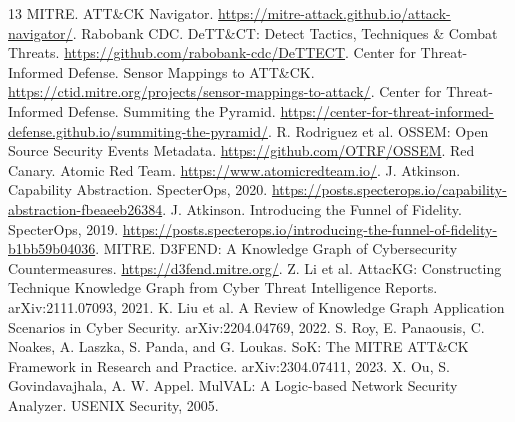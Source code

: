\documentclass[10pt]{article}
\begin{document}
\begin{thebibliography}{13}
 MITRE. ATT\&CK Navigator. \url{https://mitre-attack.github.io/attack-navigator/}.
 Rabobank CDC. DeTT\&CT: Detect Tactics, Techniques \& Combat Threats. \url{https://github.com/rabobank-cdc/DeTTECT}.
 Center for Threat-Informed Defense. Sensor Mappings to ATT\&CK. \url{https://ctid.mitre.org/projects/sensor-mappings-to-attack/}.
 Center for Threat-Informed Defense. Summiting the Pyramid. \url{https://center-for-threat-informed-defense.github.io/summiting-the-pyramid/}.
 R. Rodriguez et al. OSSEM: Open Source Security Events Metadata. \url{https://github.com/OTRF/OSSEM}.
 Red Canary. Atomic Red Team. \url{https://www.atomicredteam.io/}.
 J. Atkinson. Capability Abstraction. SpecterOps, 2020. \url{https://posts.specterops.io/capability-abstraction-fbeaeeb26384}.
 J. Atkinson. Introducing the Funnel of Fidelity. SpecterOps, 2019. \url{https://posts.specterops.io/introducing-the-funnel-of-fidelity-b1bb59b04036}.
 MITRE. D3FEND: A Knowledge Graph of Cybersecurity Countermeasures. \url{https://d3fend.mitre.org/}.
 Z. Li et al. AttacKG: Constructing Technique Knowledge Graph from Cyber Threat Intelligence Reports. arXiv:2111.07093, 2021.
 K. Liu et al. A Review of Knowledge Graph Application Scenarios in Cyber Security. arXiv:2204.04769, 2022.
 S. Roy, E. Panaousis, C. Noakes, A. Laszka, S. Panda, and G. Loukas. SoK: The MITRE ATT\&CK Framework in Research and Practice. arXiv:2304.07411, 2023.
 X. Ou, S. Govindavajhala, A. W. Appel. MulVAL: A Logic-based Network Security Analyzer. USENIX Security, 2005.
\end{thebibliography}
\end{document}
